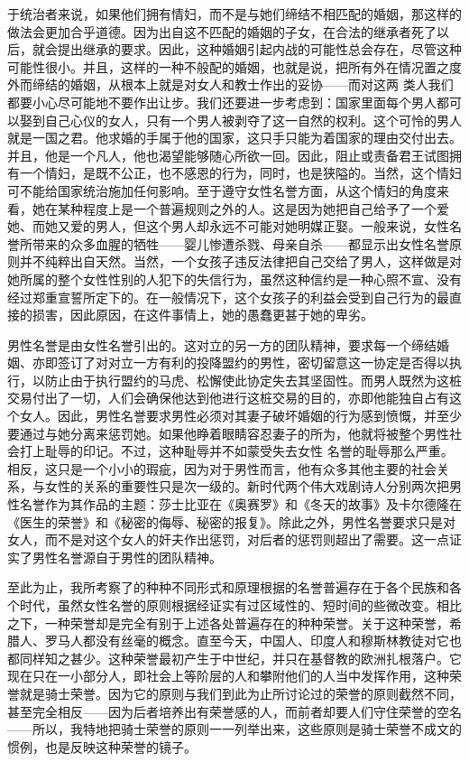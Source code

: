 \documentclass[12pt,oneside]{book}
\begin{document}
于统治者来说，如果他们拥有情妇，而不是与她们缔结不相匹配的婚姻，那这样的做法会更加合乎道德。因为出自这不匹配的婚姻的子女，在合法的继承者死了以后，就会提出继承的要求。因此，这种婚姻引起内战的可能性总会存在，尽管这种可能性很小。并且，这样的一种不般配的婚姻，也就是说，把所有外在情况置之度外而缔结的婚姻，从根本上就是对女人和教士作出的妥协——而对这两
类人我们都要小心尽可能地不要作出让步。我们还要进一步考虑到：国家里面每个男人都可以娶到自己心仪的女人，只有一个男人被剥夺了这一自然的权利。这个可怜的男人就是一国之君。他求婚的手属于他的国家，这只手只能为着国家的理由交付出去。并且，他是一个凡人，他也渴望能够随心所欲一回。因此，阻止或责备君王试图拥有一个情妇，是既不公正，也不感恩的行为，同时，也是狭隘的。当然，这个情妇可不能给国家统治施加任何影响。至于遵守女性名誉方面，从这个情妇的角度来看，她在某种程度上是一个普遍规则之外的人。这是因为她把自己给予了一个爱她、而她又爱的男人，但这个男人却永远不可能对她明媒正娶。一般来说，女性名誉所带来的众多血腥的牺牲——婴儿惨遭杀戮、母亲自杀——都显示出女性名誉原则并不纯粹出自天然。当然，一个女孩子违反法律把自己交给了男人，这样做是对她所属的整个女性性别的人犯下的失信行为，虽然这种信约是一种心照不宣、没有经过郑重宣誓所定下的。在一般情况下，这个女孩子的利益会受到自己行为的最直接的损害，因此原因，在这件事情上，她的愚蠢更甚于她的卑劣。 

男性名誉是由女性名誉引出的。这对立的另一方的团队精神，要求每一个缔结婚姻、亦即签订了对对立一方有利的投降盟约的男性，密切留意这一协定是否得以执行，以防止由于执行盟约的马虎、松懈使此协定失去其坚固性。而男人既然为这桩交易付出了一切，人们会确保他达到他进行这桩交易的目的，亦即他能独自占有这个女人。因此，男性名誉要求男性必须对其妻子破坏婚姻的行为感到愤慨，并至少要通过与她分离来惩罚她。如果他睁着眼睛容忍妻子的所为，他就将被整个男性社会打上耻辱的印记。不过，这种耻辱并不如蒙受失去女性
名誉的耻辱那么严重。相反，这只是一个小小的瑕疵，因为对于男性而言，他有众多其他主要的社会关系，与女性的关系的重要性只是次一级的。新时代两个伟大戏剧诗人分别两次把男性名誉作为其作品的主题：莎士比亚在《奥赛罗》和《冬天的故事》及卡尔德隆在《医生的荣誉》和《秘密的侮辱、秘密的报复》。除此之外，男性名誉要求只是对女人，而不是对这个女人的奸夫作出惩罚，对后者的惩罚则超出了需要。这一点证实了男性名誉源自于男性的团队精神。 

至此为止，我所考察了的种种不同形式和原理根据的名誉普遍存在于各个民族和各个时代，虽然女性名誉的原则根据经证实有过区域性的、短时间的些微改变。相比之下，一种荣誉却是完全有别于上述各处普遍存在的种种荣誉。关于这种荣誉，希腊人、罗马人都没有丝毫的概念。直至今天，中国人、印度人和穆斯林教徒对它也都同样知之甚少。这种荣誉最初产生于中世纪，并只在基督教的欧洲扎根落户。它现在只在一小部分人，即社会上等阶层的人和攀附他们的人当中发挥作用，这种荣誉就是骑士荣誉。因为它的原则与我们到此为止所讨论过的荣誉的原则截然不同，甚至完全相反——因为后者培养出有荣誉感的人，而前者却要人们守住荣誉的空名——所以，我特地把骑士荣誉的原则一一列举出来，这些原则是骑士荣誉不成文的惯例，也是反映这种荣誉的镜子。 
\end{document}
